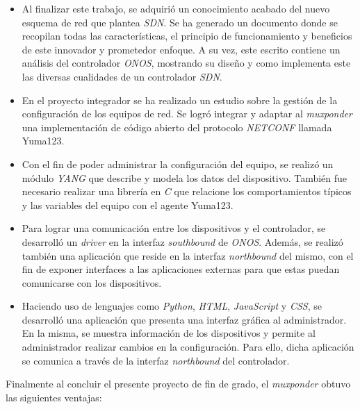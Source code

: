 \begin{itemize}

    \item Al finalizar este trabajo, se adquirió un conocimiento acabado del nuevo esquema de red que plantea  \textit{SDN}. Se ha generado un documento donde se recopilan todas las características, el principio de funcionamiento y beneficios de este innovador y prometedor enfoque. A su vez, este escrito contiene un análisis del controlador \textit{ONOS}, mostrando su diseño y como implementa este las diversas cualidades de un controlador  \textit{SDN}.

    \item En el proyecto integrador se ha realizado un estudio sobre la gestión de la configuración de los equipos de red. Se logró integrar y adaptar al \textit{muxponder} una implementación de código abierto del protocolo \textit{NETCONF} llamada Yuma123. 
    
    \item Con el fin de poder administrar la configuración del equipo, se realizó un módulo \textit{YANG} que describe y modela los datos del dispositivo. También fue necesario realizar una librería en \textit{C} que relacione los comportamientos típicos y las variables del equipo con el agente Yuma123.
        
    \item Para lograr una comunicación entre los dispositivos y el controlador, se desarrolló un \textit{driver} en la interfaz \textit{southbound} de \textit{ONOS}. Además, se realizó también una aplicación que reside en la interfaz \textit{northbound} del mismo, con el fin de exponer interfaces a las aplicaciones externas para que estas puedan comunicarse con los dispositivos. 

    \item Haciendo uso de lenguajes como \textit{Python}, \textit{HTML}, \textit{JavaScript} y \textit{CSS}, se desarrolló una aplicación que presenta una interfaz gráfica al administrador. En la misma, se muestra información de los dispositivos y permite al administrador realizar cambios en la configuración. Para ello, dicha aplicación se comunica a través de la interfaz \textit{northbound} del controlador. 

\end{itemize}

 Finalmente al concluir el presente proyecto de fin de grado, el \textit{muxponder} obtuvo las siguientes ventajas:

